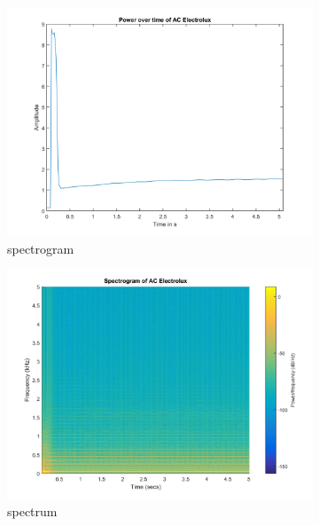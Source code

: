 \documentclass[portrait,a0b,posterdraft]{a0poster}
\begin{document}
\begin{figure}
\begin{subfigure}{.1\textwidth}
\centering
\includegraphics[width=\linewidth]{AC_Electrolux_powerTimeDomain.png}
\caption{spectrogram}
\end{subfigure}
\begin{subfigure}{.1\textwidth}
\centering
\includegraphics[width=\linewidth]{AC_Electrolux_spectrogram.png}
\caption{spectrum}
\end{subfigure}
\begin{subfigure}{.1\textwidth}
\centering

\end{subfigure}
\end{figure}
\end{document}
